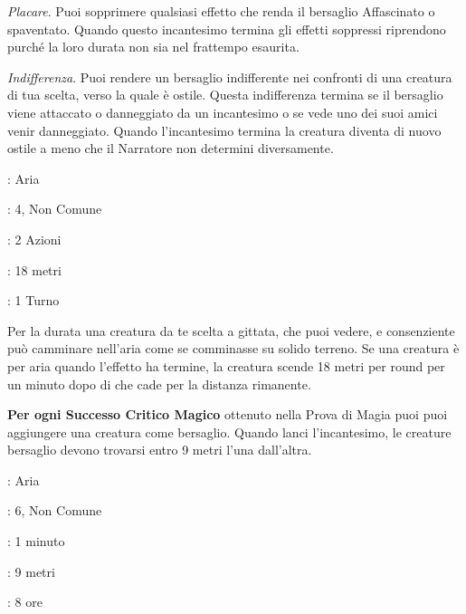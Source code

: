 \begin{multicols}{2}
\emph{Placare}. Puoi sopprimere qualsiasi effetto che renda il bersaglio Affascinato o spaventato. Quando questo incantesimo termina gli effetti soppressi riprendono purché la loro durata non sia nel frattempo esaurita.

\emph{Indifferenza}. Puoi rendere un bersaglio indifferente nei confronti di una creatura di tua scelta, verso la quale è ostile. Questa indifferenza termina se il bersaglio viene attaccato o danneggiato da un incantesimo o se vede uno dei suoi amici venir danneggiato. Quando l'incantesimo termina la creatura diventa di nuovo ostile a meno che il Narratore non determini diversamente.

\noindent\colorbox{OBSSgold!10}{
\begin{minipage}{0.95\linewidth}
\begin{description}[noitemsep, topsep=0pt, parsep=0pt, partopsep=0pt, leftmargin=0cm, labelwidth=1.3cm]
	\item[\textbf{Lista}]: Aria
	\item[\textbf{Livello}]: 4, Non Comune
	\item[\textbf{Lancio}]: 2 Azioni
	\item[\textbf{Gittata}]: 18 metri
	\item[\textbf{Durata}]: 1 Turno
\end{description}
\end{minipage}}\smallskip

Per la durata una creatura da te scelta a gittata, che puoi vedere, e consenziente può camminare nell'aria come se comminasse su solido terreno. Se una creatura è per aria quando l'effetto ha termine, la creatura scende 18 metri per round per un minuto dopo di che cade per la distanza rimanente.

\textbf{Per ogni Successo Critico Magico} ottenuto nella Prova di Magia puoi puoi aggiungere una creatura come bersaglio. Quando lanci l'incantesimo, le creature bersaglio devono trovarsi entro 9 metri l'una dall'altra.

\noindent\colorbox{OBSSgold!10}{
\begin{minipage}{0.95\linewidth}
\begin{description}[noitemsep, topsep=0pt, parsep=0pt, partopsep=0pt, leftmargin=0cm, labelwidth=1.3cm]
	\item[\textbf{Lista}]: Aria
	\item[\textbf{Livello}]: 6, Non Comune
	\item[\textbf{Lancio}]: 1 minuto
	\item[\textbf{Gittata}]: 9 metri
	\item[\textbf{Durata}]: 8 ore
\end{description}
\end{minipage}}\smallskip


\end{multicols}
